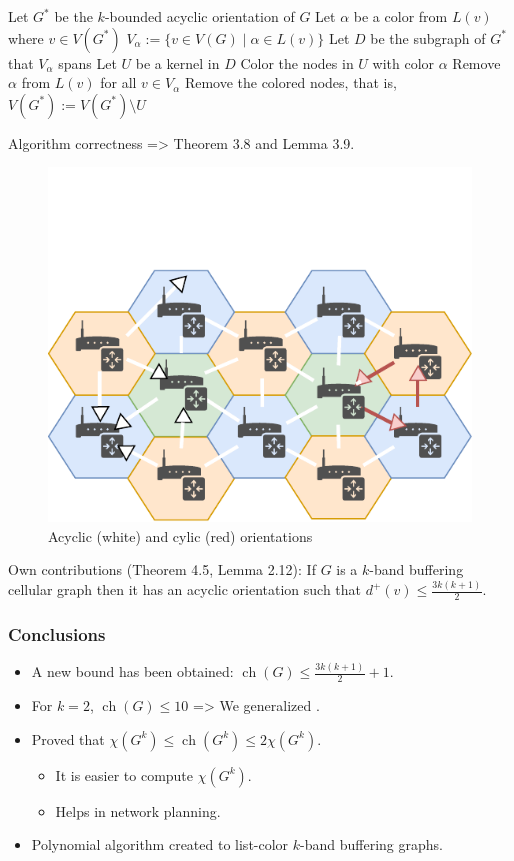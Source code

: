 \documentclass{beamer} %
\DeclareMathOperator{\ch}{ch}
\begin{document}
\begin{frame}[allowframebreaks]
\framebreak
\begin{algorithm}[H]\label{alg:szekeres-list-coloring}
  Let $G^*$ be the $k$-bounded acyclic orientation of $G$\;
   {
  	Let $\alpha$ be a color from $L(v)$ where $v \in V(G^*)$\;
  	$V_\alpha := \lbrace v \in V(G) \mid \alpha \in L(v) \rbrace$\;
  	Let $D$ be the subgraph of $G^*$ that $V_\alpha$ spans\;
  	Let $U$ be a kernel in $D$\;
  	Color the nodes in $U$ with color $\alpha$\;
  	Remove $\alpha$ from $L(v)$ for all $v \in V_\alpha$\;
  	Remove the colored nodes, that is, $V(G^*) := V(G^*) \setminus U$\;
  }
\end{algorithm}
Algorithm correctness => Theorem 3.8 and Lemma 3.9.
\begin{figure}
\centering
\includegraphics[scale=0.6]{figures/orientation-hexagonal-topology-wifi.pdf}
\caption{Acyclic (white) and cylic (red) orientations}\label{fig:orientations-cellular-graph}
\end{figure}
Own contributions (Theorem 4.5, Lemma 2.12): If $G$ is a $k$-band buffering cellular graph then it has an acyclic orientation such that $d^+(v) \leqslant \frac{3k(k+1)}{2}.$
\end{frame}
\begin{frame}
\frametitle{Conclusions}
\justifying
\begin{itemize}
\item A new bound has been obtained: $\ch(G) \leqslant \frac{3k(k+1)}{2} + 1$.
\item For $k = 2$, $\ch(G) \leqslant 10$ => We generalized \cite{7248845}.
\item Proved that $\chi(G^k) \leqslant \ch(G^k) \leqslant 2 \chi(G^k)$.
\begin{itemize}
\item It is easier to compute $\chi(G^k)$.
\item Helps in network planning.
\end{itemize}
\item Polynomial algorithm created to list-color $k$-band buffering graphs.
\end{itemize}
\end{frame}
\end{document}
